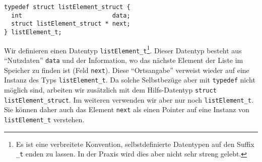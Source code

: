 \begin{codebox}
\begin{verbatim}
typedef struct listElement_struct {
  int                         data;
  struct listElement_struct * next;
} listElement_t;
\end{verbatim}
\end{codebox}

Wir definieren einen Datentyp \texttt{listElement\_t}\footnote{Es ist eine verbreitete Konvention, selbstdefinierte Datentypen auf den Suffix \texttt{\_t} enden zu lassen. In der Praxis wird dies aber nicht sehr streng gelebt.}. Dieser Datentyp besteht aus \enquote{Nutzdaten} \texttt{data} und der Information, wo das nächste Element der Liste im Speicher zu finden ist (Feld \texttt{next}). Diese \enquote{Ortsangabe} verweist wieder auf eine Instanz des Typs \texttt{listElement\_t}. Da solche Selbstbezüge aber mit \texttt{typedef} nicht möglich sind, arbeiten wir zusätzlich mit dem Hilfs-Datentyp \texttt{struct listElement_struct}. Im weiteren verwenden wir aber nur noch \texttt{listElement\_t}. Sie können daher auch das Element \texttt{next} als einen Pointer auf eine Instanz von \texttt{listElement\_t} verstehen.

